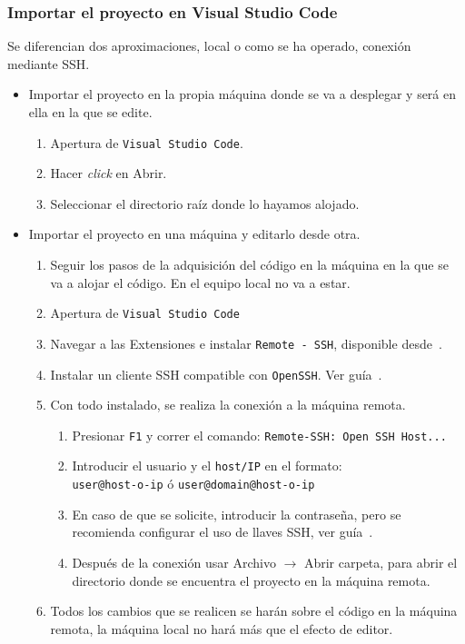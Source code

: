 \subsubsection{Importar el proyecto en Visual Studio Code}
Se diferencian dos aproximaciones, local o como se ha operado, conexión mediante SSH.

\begin{itemize}
\item Importar el proyecto en la propia máquina donde se va a desplegar y será en ella en la que se edite.
\begin{enumerate}
\item Apertura de \texttt{Visual Studio Code}.
\item Hacer \textit{click} en Abrir.
\item Seleccionar el directorio raíz donde lo hayamos alojado.
\end{enumerate}
\item Importar el proyecto en una máquina y editarlo desde otra.
\begin{enumerate}
\item Seguir los pasos de la adquisición del código en la máquina en la que se va a alojar el código. En el equipo local no va a estar.
\item Apertura de \texttt{Visual Studio Code}
\item Navegar a las Extensiones e instalar \texttt{Remote - SSH}, disponible desde~\cite{VSCode-Remote-SSH}.
\item Instalar un cliente SSH compatible con \texttt{OpenSSH}. Ver guía~\cite{Remote-Development-Tricks-Tips}.
\item Con todo instalado, se realiza la conexión a la máquina remota.
\begin{enumerate}
\item Presionar \texttt{F1} y correr el comando: \texttt{Remote-SSH: Open SSH Host...}
\item Introducir el usuario y el \texttt{host/IP} en el formato:\\
\texttt{user@host-o-ip} ó \texttt{user@domain@host-o-ip}
\item En caso de que se solicite, introducir la contraseña, pero se recomienda configurar el uso de llaves SSH, ver guía~\cite{Remote-Development-Tricks-Tips}.
\item Después de la conexión usar Archivo $\rightarrow$ Abrir carpeta, para abrir el directorio donde se encuentra el proyecto en la máquina remota.
\end{enumerate}
\item Todos los cambios que se realicen se harán sobre el código en la máquina remota, la máquina local no hará más que el efecto de editor.
\end{enumerate}
\end{itemize}

